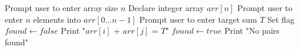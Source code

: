 \begin{algorithm}[H]
\caption{Find Pairs in Array with Given Sum}
\begin{algorithmic}[1]
\STATE Prompt user to enter array size $n$
\STATE Declare integer array $arr[n]$
\STATE Prompt user to enter $n$ elements into $arr[0 \ldots n-1]$
\STATE Prompt user to enter target sum $T$
\STATE Set flag $found \gets false$
            \STATE Print "$arr[i]$ + $arr[j]$ = $T$"
            \STATE $found \gets true$
        \ENDIF
    \ENDFOR
\ENDFOR
{}
    \STATE Print "No pairs found"
\ENDIF
\end{algorithmic}
\end{algorithm}